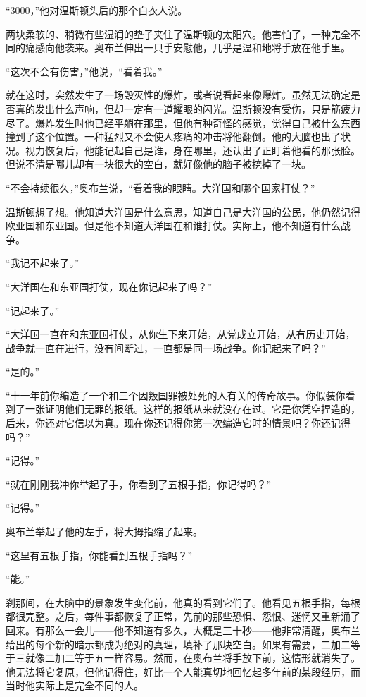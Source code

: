 ``3000，''他对温斯顿头后的那个白衣人说。

两块柔软的、稍微有些湿润的垫子夹住了温斯顿的太阳穴。他害怕了，一种完全不同的痛感向他袭来。奥布兰伸出一只手安慰他，几乎是温和地将手放在他手里。

``这次不会有伤害，''他说，``看着我。''

就在这时，突然发生了一场毁灭性的爆炸，或者说看起来像爆炸。虽然无法确定是否真的发出什么声响，但却一定有一道耀眼的闪光。温斯顿没有受伤，只是筋疲力尽了。爆炸发生时他已经平躺在那里，但他有种奇怪的感觉，觉得自己被什么东西撞到了这个位置。一种猛烈又不会使人疼痛的冲击将他翻倒。他的大脑也出了状况。视力恢复后，他能记起自己是谁，身在哪里，还认出了正盯着他看的那张脸。但说不清是哪儿却有一块很大的空白，就好像他的脑子被挖掉了一块。

``不会持续很久，''奥布兰说，``看着我的眼睛。大洋国和哪个国家打仗？''

温斯顿想了想。他知道大洋国是什么意思，知道自己是大洋国的公民，他仍然记得欧亚国和东亚国。但是他不知道大洋国在和谁打仗。实际上，他不知道有什么战争。

``我记不起来了。''

``大洋国在和东亚国打仗，现在你记起来了吗？''

``记起来了。''

``大洋国一直在和东亚国打仗，从你生下来开始，从党成立开始，从有历史开始，战争就一直在进行，没有间断过，一直都是同一场战争。你记起来了吗？''

``是的。''

``十一年前你编造了一个和三个因叛国罪被处死的人有关的传奇故事。你假装你看到了一张证明他们无罪的报纸。这样的报纸从来就没存在过。它是你凭空捏造的，后来，你还对它信以为真。现在你还记得你第一次编造它时的情景吧？你还记得吗？''

``记得。''

``就在刚刚我冲你举起了手，你看到了五根手指，你记得吗？''

``记得。''

奥布兰举起了他的左手，将大拇指缩了起来。

``这里有五根手指，你能看到五根手指吗？''

``能。''

刹那间，在大脑中的景象发生变化前，他真的看到它们了。他看见五根手指，每根都很完整。之后，每件事都恢复了正常，先前的那些恐惧、怨恨、迷惘又重新涌了回来。有那么一会儿——他不知道有多久，大概是三十秒——他非常清醒，奥布兰给出的每个新的暗示都成为绝对的真理，填补了那块空白。如果有需要，二加二等于三就像二加二等于五一样容易。然而，在奥布兰将手放下前，这情形就消失了。他无法将它复原，但他记得住，好比一个人能真切地回忆起多年前的某段经历，而当时他实际上是完全不同的人。

